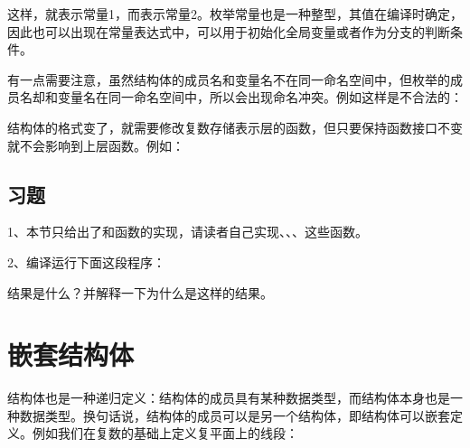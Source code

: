 

这样，就表示常量1，而表示常量2。枚举常量也是一种整型，其值在编译时确定，因此也可以出现在常量表达式中，可以用于初始化全局变量或者作为分支的判断条件。



有一点需要注意，虽然结构体的成员名和变量名不在同一命名空间中，但枚举的成员名却和变量名在同一命名空间中，所以会出现命名冲突。例如这样是不合法的：




结构体的格式变了，就需要修改复数存储表示层的函数，但只要保持函数接口不变就不会影响到上层函数。例如：



\subsection*{习题}
%


1、本节只给出了和函数的实现，请读者自己实现、、、这些函数。



2、编译运行下面这段程序：




结果是什么？并解释一下为什么是这样的结果。




\section{嵌套结构体}
%
结构体也是一种递归定义：结构体的成员具有某种数据类型，而结构体本身也是一种数据类型。换句话说，结构体的成员可以是另一个结构体，即结构体可以嵌套定义。例如我们在复数的基础上定义复平面上的线段：


